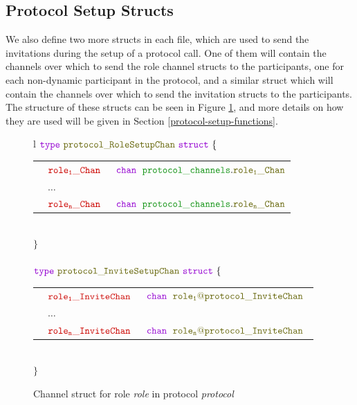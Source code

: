 \documentclass[12pt,twoside]{report}
\begin{document}
\subsection{Protocol Setup Structs}\label{protocol-setup-structs}

We also define two more structs in each file, which are used to send the invitations during the setup of a protocol call. One of them will contain the channels over which to send the role channel structs to the participants, one for each non-dynamic participant in the protocol, and a similar struct which will contain the channels over which to send the invitation structs to the participants. The structure of these structs can be seen in Figure \ref{protocol-setup-structs-gen}, and more details on how they are used will be given in Section \ref{protocol-setup-functions}.

\begin{figure}[!h]
    \begin{center}
        \begin{tabular}{l}
            $\gotype\ \structname{protocol\_\!RoleSetupChan}\ \gostruct\ \{$\\[3pt]
            \begin{tabular}{lll}
                \indent & $\structfield{role_1\_Chan}$\ &$\gochan\ \;\pkgstructaccess{protocol\_channels}{role_1\_Chan}$\\
                \indent & $\dots$ & \\
                \indent & $\structfield{role_n\_Chan}$\ &$\gochan\ \;\pkgstructaccess{protocol\_channels}{role_n\_Chan}$
            \end{tabular}\\
            $\}$\\\\[10pt]
            $\gotype\ \structname{protocol\_\!InviteSetupChan}\ \gostruct\ \{$\\[3pt]
            \begin{tabular}{lll}
                \indent & $\structfield{role_1\_InviteChan}$\ &$\gochan\ \;\structname{role_1@protocol\_InviteChan}$\\
                \indent & $\dots$ & \\
                \indent & $\structfield{role_n\_InviteChan}$\ &$\gochan\ \;\structname{role_n@protocol\_InviteChan}$\
            \end{tabular}\\
            $\}$
        \end{tabular}
    \end{center}
    \caption{Channel struct for role \textit{role} in protocol \textit{protocol}}
    \label{protocol-setup-structs-gen}
\end{figure}
\end{document}
